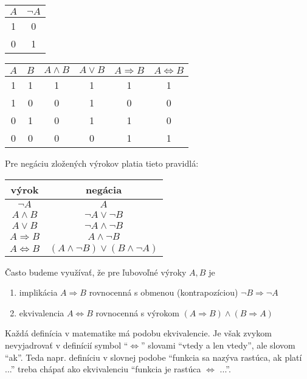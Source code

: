 \begin{center}
  \begin{tabular}{|c|c|}
    \hline
    $A$ & $\neg A$ \\
    \hline
    1 & 0 \\
    0 & 1 \\
    \hline
  \end{tabular}
  \quad
  \begin{tabular}{|c|c|c|c|c|c|}
    \hline
    $A$ & $B$ & $A \land B$ & $A \lor B$ & $A \Rightarrow B$ & $A \iff B$ \\
    \hline
    1 & 1 & 1 & 1 & 1 & 1 \\
    1 & 0 & 0 & 1 & 0 & 0 \\
    0 & 1 & 0 & 1 & 1 & 0 \\
    0 & 0 & 0 & 0 & 1 & 1 \\
    \hline
  \end{tabular}
\end{center}

Pre negáciu zložených výrokov platia tieto pravidlá:

\begin{center}
  \begin{tabular}{c | c}
    výrok & negácia \\
    \hline
    $\neg A$ & $A$ \\
    $A \land B$ & $\neg A \lor \neg B$ \\
    $A \lor B$ & $\neg A \land \neg B$ \\
    $A \Rightarrow B$ & $A \land \neg B$ \\
    $A \iff B$ & $(A \land \neg B) \lor (B \land \neg A)$
  \end{tabular}
\end{center}

Často budeme využívať, že pre ľubovoľné výroky $A, B$ je

\begin{enumerate}
  \item implikácia $A \Rightarrow B$ rovnocenná s obmenou (kontrapozíciou)
        $\neg B \Rightarrow \neg A$
  \item ekvivalencia $A \iff B$ rovnocenná s výrokom
        $(A \Rightarrow B) \land (B \Rightarrow A)$
\end{enumerate}

Každá definícia v matematike má podobu ekvivalencie. Je však zvykom
nevyjadrovať v definícií symbol \enquote{$\iff$} slovami \enquote{vtedy a len
vtedy}, ale slovom \enquote{ak}. Teda napr. definíciu v slovnej podobe
\enquote{funkcia sa nazýva rastúca, ak platí ...} treba chápať ako ekvivalenciu
\enquote{funkcia je rastúca $\iff$ ...}.

